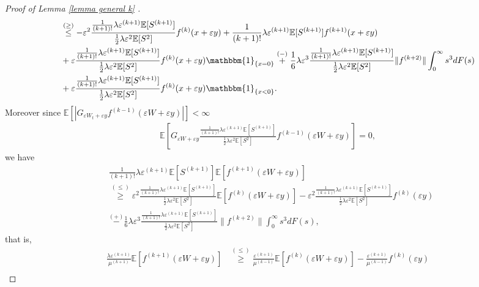 \documentclass[11pt,letterpaper,reqno]{article}
\theoremstyle{thmstyleone}%
\theoremstyle{thmstyletwo}%
\theoremstyle{thmstylethree}%
\numberwithin{equation}{section}
\begin{document}
\begin{proof}[Proof of Lemma \ref{lemma general k} ]
\begin{align*}
   & \stackrel{(\geq)} {\leq} -\varepsilon^2\frac{\frac{1}{(k+1)!}\lambda \varepsilon^{(k+1)} \mathbb E[S^{(k+1)}]}{\frac{1}{2}\lambda \varepsilon^2 \mathbb E[S^2]}f^{(k)}(x+\varepsilon y)+\frac{1}{(k+1)!}\lambda \varepsilon^{(k+1)} \mathbb E[S^{(k+1)}]f^{(k+1)}(x+\varepsilon y)\\
    &+\varepsilon \frac{\frac{1}{(k+1)!}\lambda \varepsilon^{(k+1)} \mathbb E[S^{(k+1)}]}{\frac{1}{2}\lambda \varepsilon^2 \mathbb E[S^2]} f^{(k)}(x+\varepsilon y)\mathbbm{1}_{\{x=0\}}
    \stackrel{(-)}{+}\frac{1}{6} \lambda \varepsilon^3 \frac{\frac{1}{(k+1)!}\lambda \varepsilon^{(k+1)} \mathbb E[S^{(k+1)}]}{\frac{1}{2}\lambda \varepsilon^2 \mathbb E[S^2]} \|f^{(k+2)}\| \int_0^\infty s^3dF(s)\\
    &+\varepsilon \frac{\frac{1}{(k+1)!}\lambda \varepsilon^{(k+1)} \mathbb E[S^{(k+1)}]}{\frac{1}{2}\lambda \varepsilon^2 \mathbb E[S^2]}f^{(k)}(x+\varepsilon y)\mathbbm{1}_{\{x<0\}}.
\end{align*}
Moreover since $ \mathbb E[|G_{\varepsilon W_t+\varepsilon y}f^{(k-1)}(\varepsilon W+\varepsilon y)| ] <\infty$
\begin{align*}
   \mathbb E\left[ G_{\varepsilon W+\varepsilon y}\frac{\frac{1}{(k+1)!}\lambda \varepsilon^{(k+1)} \mathbb E[S^{(k+1)}]}{\frac{1}{2}\lambda \varepsilon^2 \mathbb E[S^2]}f^{(k-1)}(\varepsilon W+\varepsilon y)\right]=0,
\end{align*}
we have
\begin{align*}
   & \frac{1}{(k+1)!}\lambda \varepsilon^{(k+1)} \mathbb E[S^{(k+1)}]\mathbb E[f^{(k+1)}(\varepsilon W+\varepsilon y)]\\
   &\stackrel{(\leq)}{\geq} \varepsilon^2\frac{\frac{1}{(k+1)!}\lambda \varepsilon^{(k+1)} \mathbb E[S^{(k+1)}]}{\frac{1}{2}\lambda \varepsilon^2 \mathbb E[S^2]}\mathbb E[f^{(k)}(\varepsilon W+\varepsilon y)]-\varepsilon^2 \frac{\frac{1}{(k+1)!}\lambda \varepsilon^{(k+1)} \mathbb E[S^{(k+1)}]}{\frac{1}{2}\lambda \varepsilon^2 \mathbb E[S^2]} f^{(k)}(\varepsilon y)\\
    &\stackrel{(+)}{-}\frac{1}{6} \lambda \varepsilon^3 \frac{\frac{1}{(k+1)!}\lambda \varepsilon^{(k+1)} \mathbb E[S^{(k+1)}]}{\frac{1}{2}\lambda \varepsilon^2 \mathbb E[S^2]} \|f^{(k+2)}\| \int_0^\infty s^3 dF(s),
\end{align*}
that is,
\begin{align}\label{stg10}
 \nonumber \nonumber   \frac{\lambda \varepsilon^{(k+1)}}{\mu^{(k+1)}}\mathbb E[f^{(k+1)}(\varepsilon W+\varepsilon y)] &\stackrel{(\leq)} {\geq} \frac{\varepsilon^{(k+1)}}{\mu^{(k-1)}}\mathbb E[f^{(k)}(\varepsilon W+\varepsilon y)]-\frac{\varepsilon^{(k+1)}}{\mu^{(k-1)}}f^{(k)}(\varepsilon y)\\

\end{align}
\end{proof}
\end{document}
